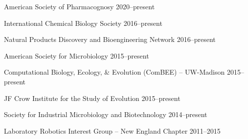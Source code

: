 

\begin{cvhonors}

\cvhonor
{American Society of Pharmacognosy}
{}
{2020--present}

\cvhonor
{International Chemical Biology Society}
{}
{2016--present}

\cvhonor
{Natural Products Discovery and Bioengineering Network}
{}
{2016--present}

\cvhonor
{American Society for Microbiology}
{}
{2015--present}

\cvhonor
{Computational Biology, Ecology, \& Evolution (ComBEE) -- UW-Madison}
{}
{2015--present}

\cvhonor
{JF Crow Institute for the Study of Evolution}
{}
{2015--present}

\cvhonor
{Society for Industrial Microbiology and Biotechnology}
{}
{2014--present}

\cvhonor
{Laboratory Robotics Interest Group -- New England Chapter}
{}
{2011--2015}

\end{cvhonors}